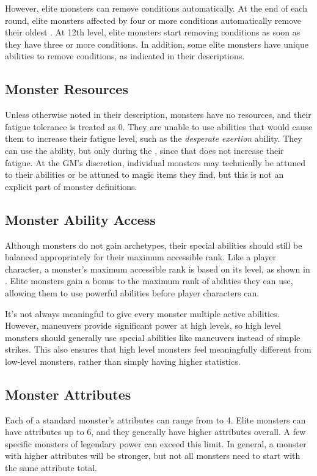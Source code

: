             However, elite monsters can remove conditions automatically.
            At the end of each round, elite monsters affected by four or more conditions automatically remove their oldest .
            At 12th level, elite monsters start removing conditions as soon as they have three or more conditions.
            In addition, some elite monsters have unique abilities to remove conditions, as indicated in their descriptions.

        \subsection{Monster Resources}
            Unless otherwise noted in their description, monsters have no resources, and their fatigue tolerance is treated as 0.
            They are unable to use abilities that would cause them to increase their fatigue level, such as the \textit{desperate exertion} ability.
            They can use the  ability, but only during the , since that does not increase their fatigue.
            At the GM's discretion, individual monsters may technically be attuned to their abilities or be attuned to magic items they find, but this is not an explicit part of monster definitions.

        \subsection{Monster Ability Access}\label{Monster Ability Access}
            Although monsters do not gain archetypes, their special abilities should still be balanced appropriately for their maximum accessible rank.
            Like a player character, a monster's maximum accessible rank is based on its level, as shown in .
            Elite monsters gain a  bonus to the maximum rank of abilities they can use, allowing them to use powerful abilities before player characters can.

            It's not always meaningful to give every monster multiple active abilities.
            However, maneuvers provide significant power at high levels, so high level monsters should generally use special abilities like maneuvers instead of simple strikes.
            This also ensures that high level monsters feel meaningfully different from low-level monsters, rather than simply having higher statistics.

    \subsection{Monster Attributes}\label{Monster Attributes}
        Each of a standard monster's attributes can range from  to 4.
        Elite monsters can have attributes up to 6, and they generally have higher attributes overall.
        A few specific monsters of legendary power can exceed this limit.
        In general, a monster with higher attributes will be stronger, but not all monsters need to start with the same attribute total.

